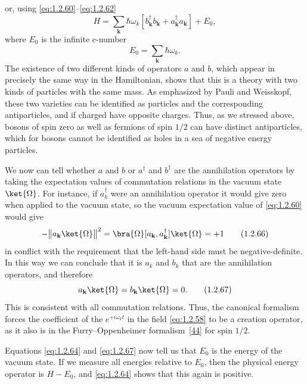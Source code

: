 or, using \eqref{eq:1.2.60}--\eqref{eq:1.2.62}
\begin{equation}
  H=\sum_{\mathbf k}\hbar\omega_k
  \left[b^{\dagger}_{\mathbf k}b_{\mathbf k}
       +a^{\dagger}_{\mathbf k}a_{\mathbf k}\right]+E_0,
  \tag{1.2.64}\label{eq:1.2.64}
\end{equation}
where $E_0$ is the infinite c-number
\begin{equation}
  E_0=\sum_{\mathbf k}\hbar\omega_k.
  \tag{1.2.65}\label{eq:1.2.65}
\end{equation}
The existence of two different kinds of operators $a$ and $b$, which appear
in precisely the same way in the Hamiltonian, shows that this is a theory
with two kinds of particles with the same mass. As emphasized by Pauli and
Weisskopf, these two varieties can be identified as particles and the
corresponding antiparticles, and if charged have opposite charges. Thus, as
we stressed above, bosons of spin zero as well as fermions of spin $1/2$ can
have distinct antiparticles, which for bosons cannot be identified as holes
in a sea of negative energy particles.

We now can tell whether $a$ and $b$ or $a^{\dagger}$ and $b^{\dagger}$ are
the annihilation operators by taking the expectation values of commutation
relations in the vacuum state $\ket{\Omega}$. For instance, if
$a_k^{\dagger}$ were an annihilation operator it would give zero when applied
to the vacuum state, so the vacuum expectation value of \eqref{eq:1.2.60} would give
\begin{equation}
  -\bigl\|a_{\mathbf k}\ket{\Omega}\bigr\|^2
  =\bra{\Omega}[a_{\mathbf k},a^{\dagger}_{\mathbf k}]\ket{\Omega}=+1
  \tag{1.2.66}\label{eq:1.2.66}
\end{equation}
in conflict with the requirement that the left-hand side must be
negative-definite. In this way we can conclude that it is $a_k$ and $b_k$ that
are the annihilation operators, and therefore
\begin{equation}
  a_{\mathbf k}\ket{\Omega}=b_{\mathbf k}\ket{\Omega}=0.
  \tag{1.2.67}\label{eq:1.2.67}
\end{equation}
This is consistent with all commutation relations. Thus, the canonical
formalism forces the coefficient of the $e^{+i\omega_kt}$ in the field \eqref{eq:1.2.58}
to be a creation operator, as it also is in the Furry--Oppenheimer
formalism~\hyperref[ref:1.44]{[44]} for spin $1/2$.

Equations \eqref{eq:1.2.64} and \eqref{eq:1.2.67} now tell us that $E_0$ is the energy of the
vacuum state. If we measure all energies relative to $E_0$, then the physical
energy operator is $H-E_0$, and \eqref{eq:1.2.64} shows that this again is positive.

